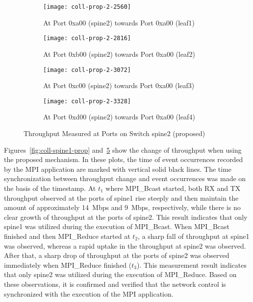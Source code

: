 \begin{figure}
    \begin{subfigure}{.45\linewidth}
        \texttt{[image: coll-prop-2-2560]}
        \caption{At Port 0xa00 (spine2) \newline towards Port 0xa00 (leaf1)}%
        \label{fig:spine2-leaf1-prop}
    \end{subfigure}
    \begin{subfigure}{.45\linewidth}
        \texttt{[image: coll-prop-2-2816]}
        \caption{At Port 0xb00 (spine2) \newline towards Port 0xa00 (leaf2)}%
        \label{fig:spine2-leaf2-prop}
    \end{subfigure}
    \begin{subfigure}{.45\linewidth}
        \texttt{[image: coll-prop-2-3072]}
        \caption{At Port 0xc00 (spine2) \newline towards Port 0xa00 (leaf3)}%
        \label{fig:spine2-leaf3-prop}
    \end{subfigure}
    \begin{subfigure}{.45\linewidth}
        \texttt{[image: coll-prop-2-3328]}
        \caption{At Port 0xd00 (spine2) \newline towards Port 0xa00 (leaf4)}%
        \label{fig:spine2-leaf4-prop}
    \end{subfigure}
    \caption{Throughput Measured at Ports on Switch spine2 (proposed)}%
    \label{fig:coll-spine2-prop}
\end{figure}


Figures~\ref{fig:coll-spine1-prop} and~\ref{fig:coll-spine2-prop} show
the change of throughput when using the proposed mechanism. In these
plots, the time of event occurrences recorded by the MPI application are
marked with vertical solid black lines. The time synchronization between
throughput change and event occurrences was made on the basis of the
timestamp. At \(t_1\) where MPI\_Bcast started, both RX and TX
throughput observed at the ports of spine1 rise steeply and then
maintain the amount of approximately 14~Mbps and 9~Mbps, respectively,
while there is no clear growth of throughput at the ports of spine2.
This result indicates that only spine1 was utilized during the execution of
MPI\_Bcast. When MPI\_Bcast finished and then MPI\_Reduce started at
\(t_2\), a sharp fall of throughput at spine1 was observed, whereas a
rapid uptake in the throughput at spine2 was observed. After that, a
sharp drop of throughput at the ports of spine2 was observed immediately
when MPI\_Reduce finished (\(t_3\)). This measurement result indicates
that only spine2 was utilized during the execution of MPI\_Reduce. Based
on these observations, it is confirmed and verified that the network
control is synchronized with the execution of the MPI application.

